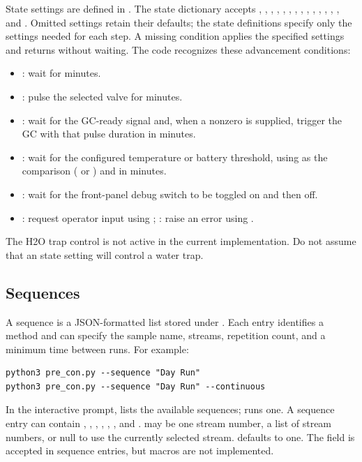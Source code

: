 State settings are defined in . The state dictionary
accepts , , , , ,
, , , , ,
, , , , and
. Omitted settings retain their defaults; the state definitions
specify only the settings needed for each step. A missing condition applies
the specified settings and returns without waiting. The code recognizes these
advancement conditions:
\begin{itemize}
    \item {}: wait for  minutes.
    \item {}: pulse the selected valve for  minutes.
    \item {}: wait for the GC-ready signal and, when a nonzero
     is supplied, trigger the GC with that pulse duration in
    minutes.
    \item {}: wait for the configured temperature or battery
    threshold, using  as the comparison (\code{>} or \code{<})
    and  in minutes.
    \item {}: wait for the front-panel debug switch to be toggled
    on and then off.
    \item {}: request operator input using ;
    : raise an error using .
\end{itemize}
The H2O trap control is not active in the current implementation. Do not
assume that an  state setting will control a water trap.

\subsection{Sequences}

A sequence is a JSON-formatted list stored under . Each
entry identifies a method and can specify the sample name, streams,
repetition count, and a minimum time between runs. For example:
\begin{verbatim}
python3 pre_con.py --sequence "Day Run"
python3 pre_con.py --sequence "Day Run" --continuous
\end{verbatim}
In the interactive prompt,  lists the available
sequences;  runs one. A sequence entry can
contain , , , ,
, , and .  may be
one stream number, a list of stream numbers, or null to use the currently
selected stream.  defaults to one. The  field
is accepted in sequence entries, but macros are not implemented.

